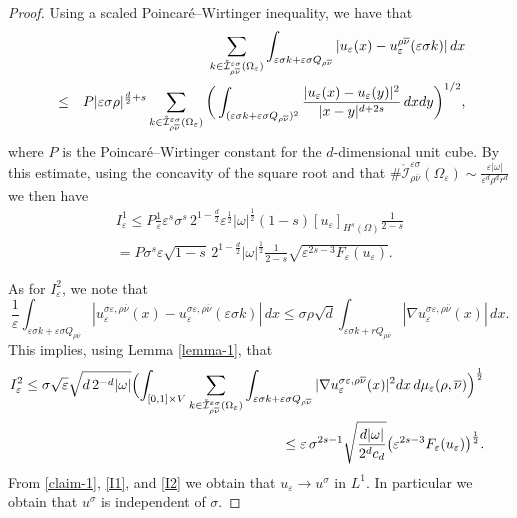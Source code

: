 \documentclass{article}
\newcommand{\e}{\varepsilon}
\begin{document}
\begin{proof}
Using  a  scaled Poincar\'e--Wirtinger inequality, we have that
\begin{eqnarray*}\label{attempt4} && \hskip-1cm\nonumber
    \sum_{{k \in {\mathring{\mathcal I}}^{\e\sigma}_{\rho\overline{\nu}}(\Omega_\e)}} \int_{{\e\sigma}k+{\e\sigma}Q_{\rho\overline{\nu}}} |u_\e(x) - u_\e^{\rho\overline{\nu}}({\e\sigma}k)|\,dx  \\ \nonumber 
    &\leq& P|{\e\sigma}\rho|^{\frac{d}{2}+s} \sum_{k \in {\mathring{\mathcal I}}^{\e\sigma}_{\rho\overline{\nu}}(\Omega_\e)}\bigg(\int_{({\e\sigma}k+{\e\sigma}Q_{\rho\overline{\nu}})^2}\frac{|u_\e(x)-u_\e(y)|^2}{|x-y|^{d+2s}}\,dxdy\bigg)^{1/2},
    \end{eqnarray*} 
where $P$ is the Poincar\'e--Wirtinger constant for the  $d$-dimensional unit cube. By this estimate, 
using the concavity of the square root and that $\#{\mathring{\mathcal I}}^{\e\sigma}_{\rho\overline{\nu}}(\Omega_\e)\sim \frac{\e|\omega|}{\e^d\rho^{d}r^d}$ we then have 
\begin{eqnarray}\label{I1}\nonumber
I^1_\e\le P \frac1\e \e^{s}\sigma^s\,2^{1-\frac{d}{2}}\e^{\frac12}|\omega|^{\frac12}(1-s) [u_\e]_{H^{s}(\Omega)} \frac{1}{2-s}
\\
= P\sigma^s\e\sqrt{1-s}\,2^{1-\frac{d}{2}}|\omega|^{\frac12} \frac{1}{2-s}  \sqrt{\e^{2s- 3}F_\e(u_\e)}.
\end{eqnarray}

As for $I^2_\e$, we note that
$$
\frac1\e\int_{{\e\sigma}k+{\e\sigma}Q_{\rho\overline{\nu}}} |u^{{\sigma\e},\rho\overline{\nu}}_\e(x) - u_\e^{{\sigma}\e,\rho\overline{\nu}}({\e\sigma}k)|\,dx\le\sigma\rho \sqrt d\int_{{\e\sigma}k+rQ_{\rho\overline{\nu}}} |\nabla u^{{\sigma\e},\rho\overline{\nu}}_\e(x)|\,dx.
$$
This implies, using Lemma \ref{lemma-1}, that
\begin{eqnarray}\label{I2}\nonumber
&&\hskip-1cmI^2_\e\le \sigma\sqrt\e \sqrt{d\, 2^{-d}|\omega|} \Bigl(  \int_{[0,1]\times V} \sum_{k \in {\mathring{\mathcal I}}^{\e\sigma}_{\rho\overline{\nu}}(\Omega_\e)}\int_{\e\sigma k+\e\sigma Q_{\rho\overline{\nu}}} |\nabla u_\e^{\sigma\e,\rho\overline{\nu}}(x)|^2 dx\, d\mu_\e(\rho,\overline{\nu}) \Bigr)^{\frac{1}{2}}\\
     &&\hskip-.5cm\le\e\,  \sigma^{2s-1} \sqrt{\frac{d|\omega|}{2^d{c_d}}} \big(\e^{2s- 3}F_\e(u_\e)\big)^{\frac12}.
\end{eqnarray}
From \eqref{claim-1}, \eqref{I1}, and \eqref{I2} we obtain that $u_\e\to u^\sigma$ in $L^1$. In particular we obtain that $u^\sigma$ is independent of $\sigma$. 
\end{proof}
\end{document}
